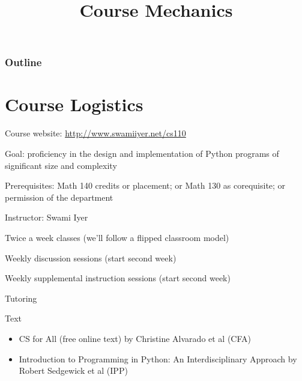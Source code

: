 \documentclass[8pt,a4paper,compress]{beamer}
\title{Course Mechanics}
\date{}
\begin{document}
\begin{frame}
\vfill
\titlepage
\end{frame}

\begin{frame}
\frametitle{Outline}
\tableofcontents
\end{frame}

\section{Course Logistics}
\begin{frame}[fragile]
\pause

Course website: \href{http://www.swamiiyer.net/cs110}{http://www.swamiiyer.net/cs110 \ExternalLink}

\pause
\bigskip

Goal: proficiency in the design and implementation of Python programs of significant size and complexity

\pause
\bigskip

Prerequisites: Math 140 credits or placement; or Math 130 as corequisite; or permission of the department

\pause
\bigskip

Instructor: Swami Iyer

\pause
\bigskip

Twice a week classes (we'll follow a flipped classroom model)

\pause
\bigskip

Weekly discussion sessions (start second week)

\pause
\bigskip

Weekly supplemental instruction sessions (start second week)

\pause
\bigskip

Tutoring

\pause
\bigskip

Text
\begin{itemize}
\item CS for All (free online text) by Christine Alvarado et al (CFA)
\item Introduction to Programming in Python: An Interdisciplinary Approach by Robert Sedgewick et al (IPP)
\end{itemize}
\end{frame}
\end{document}
